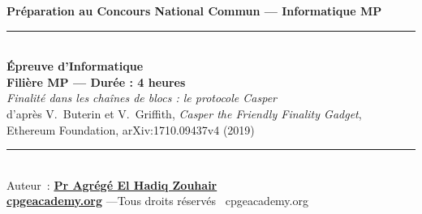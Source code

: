 \begin{center}
{\large\bfseries Préparation au Concours National Commun --- Informatique MP}\\[8pt]
\rule{0.9\linewidth}{0.5pt}\\[6pt]
{\Large\bfseries Épreuve d'Informatique}\\[4pt]
{\bfseries Filière MP --- Durée : 4 heures}\\[6pt]
{\itshape Finalité dans les chaînes de blocs : le protocole Casper}\\[2pt]
{\small d'après V.~Buterin et V.~Griffith, \emph{Casper the Friendly Finality Gadget}, \\ Ethereum Foundation, arXiv:1710.09437v4 (2019)}\\[6pt]
\rule{0.9\linewidth}{0.5pt}\\[8pt]
{\small Auteur~: \href{https://orcid.org/0000-0002-6108-7176}{\textbf{Pr Agrégé El Hadiq Zouhair}}}\\[3pt]
{\small \href{https://cpgeacademy.org}{\textbf{cpgeacademy.org}} \quad---\quad Tous droits réservés \textcopyright\ cpgeacademy.org}
\end{center}
\medskip
\begin{center}
\end{center}
\medskip
